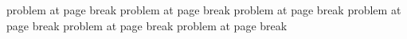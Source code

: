 \documentclass{article}
\begin{document}
\mbox{}
\vspace{16.5cm}

\begin{nlst}
problem at page break
problem at page break
problem at page break
problem at page break
problem at page break
problem at page break
\end{nlst}
\end{document}
